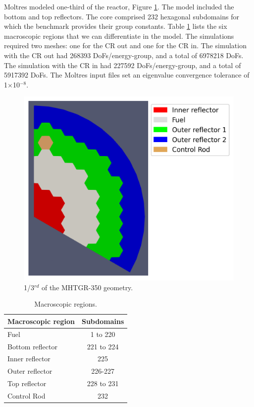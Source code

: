 \documentclass[11pt,letterpaper]{article}
\begin{document}
Moltres modeled one-third of the reactor, Figure \ref{fig:bench-mesh}.
The model included the bottom and top reflectors.
The core comprised 232 hexagonal subdomains for which the benchmark provides their group constants.
Table \ref{tab:mac-region} lists the six macroscopic regions that we can differentiate in the model.
The simulations required two meshes: one for the CR out and one for the CR in.
The simulation with the CR out had 268393 \glspl{DoF}/energy-group, and a total of 6978218 DoFs.
The simulation with the CR in had 227592 \glspl{DoF}/energy-group, and a total of 5917392 DoFs.
The Moltres input files set an eigenvalue convergence tolerance of 1$\times$10$^{-8}$.

\begin{figure}[htbp!]
	\centering
	\includegraphics[width=0.55\linewidth]{figures-benchmark/oecd-fullcore-legend}
	\hfill
	\caption{1/3$^{rd}$ of the MHTGR-350 geometry.}
	\label{fig:bench-mesh}
\end{figure}

\begin{table}[htbp!]
  \centering
  \caption{Macroscopic regions.}
  \label{tab:mac-region}
  \begin{tabular}{@{}l c}
  \toprule
  Macroscopic region    & Subdomains     \\
  \midrule
  Fuel              & 1 to 220      \\
  Bottom reflector  & 221 to 224    \\
  Inner reflector   & 225           \\
  Outer reflector   & 226-227       \\
  Top reflector     & 228 to 231    \\
  Control Rod       & 232           \\
  \bottomrule
  \end{tabular}
\end{table}
\end{document}
